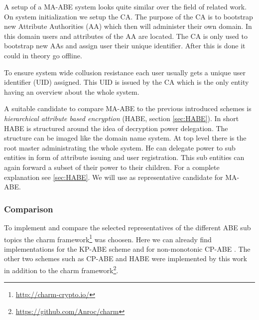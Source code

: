 A setup of a \ac{MA-ABE} system looks quite similar over the field of related work. On system initialization we setup the \ac{CA}. The purpose of the \ac{CA} is to bootstrap new Attribute Authorities (\ac{AA}) which then will administer their own domain. In this domain users and attributes of the \ac{AA} are located. The CA is only used to bootstrap new AAs and assign user their unique identifier. After this is done it could in theory go offline. 

To ensure system wide collusion resistance each user usually gets a unique user identifier (\ac{UID}) assigned. This \ac{UID} is issued by the \ac{CA} which is the only entity having an overview about the whole system. 

A suitable candidate to compare \ac{MA-ABE} to the previous introduced schemes is \textit{hierarchical attribute based encryption} (\ac{HABE}, section \ref{sec:HABE}). In short \ac{HABE} is structured around the idea of decryption power delegation. The structure can be imaged like the domain name system. At top level there is the root master administrating the whole system. He can delegate power to sub entities in form of attribute issuing and user registration. This sub entities can again forward a subset of their power to their children. For a complete explanation see \ref{sec:HABE}. We will use \cite{Wang:2010:HAE:1866307.1866414} as representative candidate for \ac{MA-ABE}. 

\subsubsection{Comparison}
To implement and compare the selected representatives of the different ABE sub topics the charm framework\footnote{\url{http://charm-crypto.io/}} was choosen. Here we can already find implementations for the \ac{KP-ABE} scheme \cite{lewko2010revocation} and for non-monotonic \ac{CP-ABE} \cite{10.1007/978-3-642-54631-0_16}. The other two schemes such as \ac{CP-ABE} \cite{liu2016practical} and HABE \cite{wang2011hierarchical} were implemented  by this work in addition to the charm framework\footnote{\url{https://github.com/Anroc/charm}}. 

